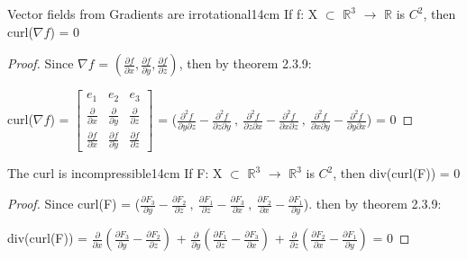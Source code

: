     \vspace{0.5cm}



    \begin{wtheorem}{Vector fields from Gradients are irrotational}{14cm}
        If f: X $\subset$ $\mathbb{R}^3$ $\rightarrow$ $\mathbb{R}$
        is $C^2$, then curl($\nabla f$) = 0
    \end{wtheorem}

    \begin{proof}
        Since $\nabla f$
        = $(\frac{\partial f}{\partial x},
            \frac{\partial f}{\partial y},
            \frac{\partial f}{\partial z})$,
        then by {\color{red} theorem 2.3.9}:

        \hspace{0.5cm}
        curl($\nabla f$) =
        $
        \begin{bmatrix}
            e_1 & e_2 & e_3 \\
            \frac{\partial}{\partial x} & \frac{\partial}{\partial y}
                & \frac{\partial}{\partial z} \\
            \frac{\partial f}{\partial x} & \frac{\partial f}{\partial y}
                & \frac{\partial f}{\partial z}
        \end{bmatrix}
        $
        = ($\frac{\partial^2 f}{\partial y\partial z}
                - \frac{\partial^2 f}{\partial z\partial y} \ , \
            \frac{\partial^2 f}{\partial z\partial x}
                - \frac{\partial^2 f}{\partial x\partial z} \ , \
            \frac{\partial^2 f}{\partial x\partial y}
                - \frac{\partial^2 f}{\partial y\partial x}$)
        = 0
    \end{proof}

    \vspace{0.5cm}



    \begin{wtheorem}{The curl is incompressible}{14cm}
        If F: X $\subset$ $\mathbb{R}^3$ $\rightarrow$ $\mathbb{R}^3$
        is $C^2$, then div(curl(F)) = 0
    \end{wtheorem}

    \begin{proof}
        Since curl(F)
        = ($\frac{\partial F_3}{\partial y}-\frac{\partial F_2}{\partial z} \ , \
            \frac{\partial F_1}{\partial z}-\frac{\partial F_3}{\partial x} \ , \
            \frac{\partial F_2}{\partial x}-\frac{\partial F_1}{\partial y}$).
        then by {\color{red} theorem 2.3.9}:

        \hspace{0.5cm}
        div(curl(F))
        = $\frac{\partial}{\partial x}
            (\frac{\partial F_3}{\partial y}-\frac{\partial F_2}{\partial z})$
            + $\frac{\partial}{\partial y}
            (\frac{\partial F_1}{\partial z}-\frac{\partial F_3}{\partial x})$
            + $\frac{\partial}{\partial z}
            (\frac{\partial F_2}{\partial x}-\frac{\partial F_1}{\partial y})$
        = 0
    \end{proof}

    


